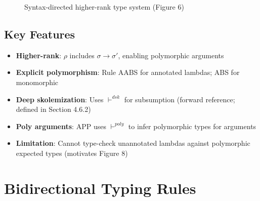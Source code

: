 \documentclass[11pt,a4paper]{article}
\begin{document}
\begin{figure}[htbp]
{\begin{minipage}{0.95\textwidth}
\begin{minipage}[t]{0.45\textwidth}
\bigskip

\begin{mathpar}
\end{mathpar}
\end{minipage}

\bigskip
\end{minipage}%
}
\caption{Syntax-directed higher-rank type system (Figure 6)}
\label{fig:higher-rank}
\end{figure}

\subsection{Key Features}

\begin{itemize}
\item \textbf{Higher-rank}: $\rho$ includes $\sigma \to \sigma'$, enabling polymorphic arguments
\item \textbf{Explicit polymorphism}: Rule AABS for annotated lambdas; ABS for monomorphic
\item \textbf{Deep skolemization}: Uses $\vdash^{dsk}$ for subsumption (forward reference; defined in Section 4.6.2)
\item \textbf{Poly arguments}: APP uses $\vdash^{poly}$ to infer polymorphic types for arguments
\item \textbf{Limitation}: Cannot type-check unannotated lambdas against polymorphic expected types (motivates Figure 8)
\end{itemize}

\section{Bidirectional Typing Rules}
\end{document}
